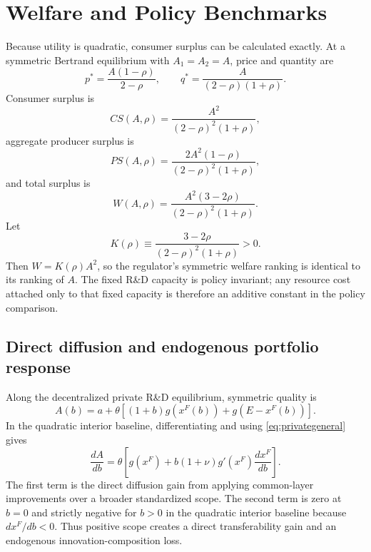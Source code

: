 \section{Welfare and Policy Benchmarks}

Because utility is quadratic, consumer surplus can be calculated exactly. At a symmetric Bertrand equilibrium with $A_1=A_2=A$, price and quantity are
\begin{equation}
 p^*=\frac{A(1-\rho)}{2-\rho},
 \qquad
 q^*=\frac{A}{(2-\rho)(1+\rho)}.
 \label{eq:symmetricpq}
\end{equation}
Consumer surplus is
\begin{equation}
 CS(A,\rho)=\frac{A^2}{(2-\rho)^2(1+\rho)},
 \label{eq:CS}
\end{equation}
aggregate producer surplus is
\begin{equation}
 PS(A,\rho)=\frac{2A^2(1-\rho)}{(2-\rho)^2(1+\rho)},
 \label{eq:PS}
\end{equation}
and total surplus is
\begin{equation}
 W(A,\rho)=\frac{A^2(3-2\rho)}{(2-\rho)^2(1+\rho)}.
 \label{eq:W}
\end{equation}
Let
\begin{equation}
 K(\rho)\equiv\frac{3-2\rho}{(2-\rho)^2(1+\rho)}>0.
\end{equation}
Then $W=K(\rho)A^2$, so the regulator's symmetric welfare ranking is identical to its ranking of $A$. The fixed R\&D capacity is policy invariant; any resource cost attached only to that fixed capacity is therefore an additive constant in the policy comparison.

\subsection{Direct diffusion and endogenous portfolio response}

Along the decentralized private R\&D equilibrium, symmetric quality is
\begin{equation}
 A(b)=a+\theta\left[(1+b)g(x^F(b))+g(E-x^F(b))\right].
 \label{eq:Ab}
\end{equation}
In the quadratic interior baseline, differentiating and using \eqref{eq:privategeneral} gives
\begin{equation}
 \frac{dA}{db}
 =\theta\left[
 g(x^F)+b(1+\nu)g'(x^F)\frac{dx^F}{db}
 \right].
 \label{eq:decomposition}
\end{equation}
The first term is the direct diffusion gain from applying common-layer improvements over a broader standardized scope. The second term is zero at $b=0$ and strictly negative for $b>0$ in the quadratic interior baseline because $dx^F/db<0$. Thus positive scope creates a direct transferability gain and an endogenous innovation-composition loss.

